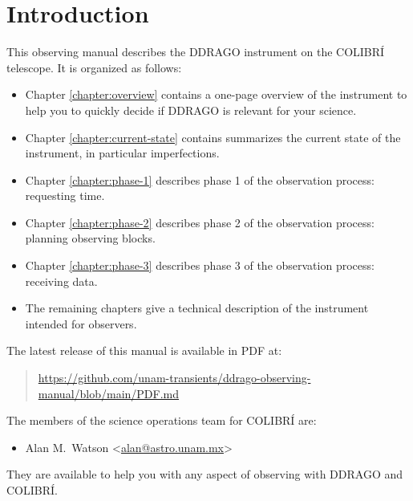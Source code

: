 \chapter{Introduction}

This observing manual describes the DDRAGO instrument on the COLIBRÍ telescope. It is organized as follows:

\begin{itemize}
\item Chapter \ref{chapter:overview} contains a one-page overview of the instrument to help you to quickly decide if DDRAGO is relevant for your science. 
\item Chapter \ref{chapter:current-state} contains summarizes the current state of the instrument, in particular imperfections. 
\item Chapter \ref{chapter:phase-1} describes phase 1 of the observation process: requesting time.
\item Chapter \ref{chapter:phase-2} describes phase 2 of the observation process: planning observing blocks.
\item Chapter \ref{chapter:phase-3} describes phase 3 of the observation process: receiving data.
\item The remaining chapters give a technical description of the instrument intended for observers.
\end{itemize}

The latest release of this manual is available in PDF at:

\begin{quote}
\url{https://github.com/unam-transients/ddrago-observing-manual/blob/main/PDF.md}
\end{quote}
The members of the science operations team for COLIBRÍ are:
\begin{itemize}
    \item Alan M.\ Watson <\href{mailto:alan@astro.unam.mx}{alan@astro.unam.mx}>
\end{itemize}
They are available to help you with any aspect of observing with DDRAGO and COLIBRÍ.
